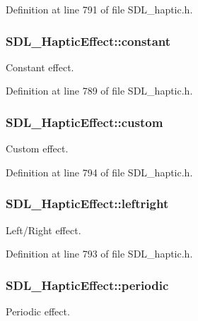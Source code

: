 Definition at line 791 of file S\-D\-L\-\_\-haptic.\-h.

\hypertarget{union_s_d_l___haptic_effect_ac435275e9683d6cc5d65b9c7cc2ec659}{
\subsubsection[{constant}]{ S\-D\-L\-\_\-\-Haptic\-Effect\-::constant}}\label{union_s_d_l___haptic_effect_ac435275e9683d6cc5d65b9c7cc2ec659}
Constant effect. 

Definition at line 789 of file S\-D\-L\-\_\-haptic.\-h.

\hypertarget{union_s_d_l___haptic_effect_a0b2d2af28c515cc39896b2b7c23019d2}{
\subsubsection[{custom}]{ S\-D\-L\-\_\-\-Haptic\-Effect\-::custom}}\label{union_s_d_l___haptic_effect_a0b2d2af28c515cc39896b2b7c23019d2}
Custom effect. 

Definition at line 794 of file S\-D\-L\-\_\-haptic.\-h.

\hypertarget{union_s_d_l___haptic_effect_a3c254b81c1ff41c7888eee0cd0076a12}{
\subsubsection[{leftright}]{ S\-D\-L\-\_\-\-Haptic\-Effect\-::leftright}}\label{union_s_d_l___haptic_effect_a3c254b81c1ff41c7888eee0cd0076a12}
Left/\-Right effect. 

Definition at line 793 of file S\-D\-L\-\_\-haptic.\-h.

\hypertarget{union_s_d_l___haptic_effect_a8320ec4db6ec1dc1d30feb62ee2a2f04}{
\subsubsection[{periodic}]{ S\-D\-L\-\_\-\-Haptic\-Effect\-::periodic}}\label{union_s_d_l___haptic_effect_a8320ec4db6ec1dc1d30feb62ee2a2f04}
Periodic effect. 

